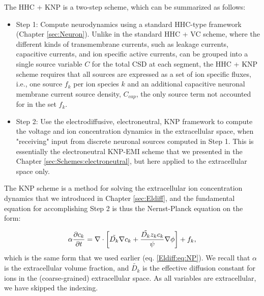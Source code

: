 The HHC + KNP is a two-step scheme, which can be summarized as follows:

\begin{itemize}
\item Step 1: Compute neurodynamics using a standard HHC-type framework (Chapter \ref{sec:Neuron}). Unlike in the standard HHC + VC scheme, where the different kinds of transmembrane currents, such as leakage currents, capacitive currents, and ion specific active currents, can be grouped into a single source variable $C$ for the total CSD at each segment, the HHC + KNP scheme requires that all sources are expressed as a set of ion specific fluxes, i.e., one source $f_k$ per ion species $k$ and an additional capacitive neuronal membrane current source density, $C_{cap}$, the only source term not accounted for in the set $f_k$.

\item Step 2: Use the electrodiffusive, electroneutral, KNP framework to compute the voltage and ion concentration dynamics in the extracellular space, when "receiving" input from discrete neuronal sources computed in Step 1. This is essentially the electroneutral KNP-EMI scheme that we presented in the Chapter \ref{sec:Schemes:electroneutral}, but here applied to the extracellular space only. 
\end{itemize}

The KNP scheme is a method for solving the extracellular ion concentration dynamics that we introduced in Chapter \ref{sec:Eldiff}, and the fundamental equation for accomplishing Step 2 is thus the Nernst-Planck equation on the form:

\begin{equation}
\alpha \frac{\partial c_k}{\partial t} = {\bf \nabla} \cdot \left[ \tilde{D_k} {\bf \nabla} c_k + \frac{\tilde{D_k} z_k c_k}{\psi} {\bf \nabla} \phi \right] + f_k,
\label{Schemes:eq:NP}
\end{equation}
which is the same form that we used earlier (eq. \ref{Eldiff:eq:NP}). We recall that $\alpha$ is the extracellular volume fraction, and $\tilde{D_k}$ is the effective diffusion constant for ions in the (coarse-grained) extracellular space. As all variables are extracellular, we have skipped the indexing. 

